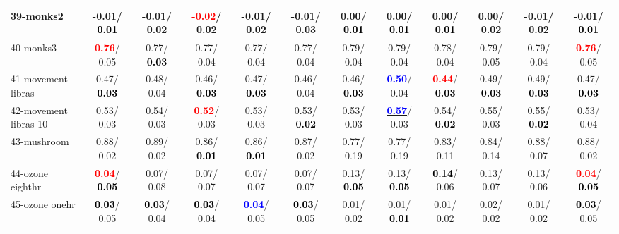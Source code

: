 \begin{table}[h]
\begin{center}
{\begin{tabular}{lc|c|c|c|c|c|c|c|c|c|c}
39-monks2 &  -0.01/\textcolor{black}{\textbf{  0.01}} &  -0.01/  0.02 & \textcolor{red}{\textbf{ -0.02}}/  0.02 &  -0.01/  0.02 &  -0.01/  0.03 &   0.00/\textcolor{black}{\textbf{  0.01}} &   0.00/\textcolor{black}{\textbf{  0.01}} &   0.00/\textcolor{black}{\textbf{  0.01}} &   0.00/  0.02 &  -0.01/  0.02 &  -0.01/\textcolor{black}{\textbf{  0.01}} \\ \hline
40-monks3 & \textcolor{red}{\textbf{  0.76}}/  0.05 &   0.77/\textcolor{black}{\textbf{  0.03}} &   0.77/  0.04 &   0.77/  0.04 &   0.77/  0.04 &   0.79/  0.04 &   0.79/  0.04 &   0.78/  0.04 &   0.79/  0.05 &   0.79/  0.04 & \textcolor{red}{\textbf{  0.76}}/  0.05 \\
41-movement libras &   0.47/\textcolor{black}{\textbf{  0.03}} &   0.48/  0.04 &   0.46/\textcolor{black}{\textbf{  0.03}} &   0.47/\textcolor{black}{\textbf{  0.03}} &   0.46/  0.04 &   0.46/\textcolor{black}{\textbf{  0.03}} & \textcolor{blue}{\textbf{  0.50}}/  0.04 & \textcolor{red}{\textbf{  0.44}}/\textcolor{black}{\textbf{  0.03}} &   0.49/\textcolor{black}{\textbf{  0.03}} &   0.49/\textcolor{black}{\textbf{  0.03}} &   0.47/\textcolor{black}{\textbf{  0.03}} \\
42-movement libras 10 &   0.53/  0.03 &   0.54/  0.03 & \textcolor{red}{\textbf{  0.52}}/  0.03 &   0.53/  0.03 &   0.53/\textcolor{black}{\textbf{  0.02}} &   0.53/  0.03 & \underline{\textcolor{blue}{\textbf{  0.57}}}/  0.03 &   0.54/\textcolor{black}{\textbf{  0.02}} &   0.55/  0.03 &   0.55/\textcolor{black}{\textbf{  0.02}} &   0.53/  0.04 \\
43-mushroom &   0.88/  0.02 &   0.89/  0.02 &   0.86/\textcolor{black}{\textbf{  0.01}} &   0.86/\textcolor{black}{\textbf{  0.01}} &   0.87/  0.02 &   0.77/  0.19 &   0.77/  0.19 &   0.83/  0.11 &   0.84/  0.14 &   0.88/  0.07 &   0.88/  0.02 \\
44-ozone eighthr & \textcolor{red}{\textbf{  0.04}}/\textcolor{black}{\textbf{  0.05}} &   0.07/  0.08 &   0.07/  0.07 &   0.07/  0.07 &   0.07/  0.07 &   0.13/\textcolor{black}{\textbf{  0.05}} &   0.13/\textcolor{black}{\textbf{  0.05}} & \textcolor{black}{\textbf{  0.14}}/  0.06 &   0.13/  0.07 &   0.13/  0.06 & \textcolor{red}{\textbf{  0.04}}/\textcolor{black}{\textbf{  0.05}} \\
45-ozone onehr & \textcolor{black}{\textbf{  0.03}}/  0.05 & \textcolor{black}{\textbf{  0.03}}/  0.04 & \textcolor{black}{\textbf{  0.03}}/  0.04 & \underline{\textcolor{blue}{\textbf{  0.04}}}/  0.05 & \textcolor{black}{\textbf{  0.03}}/  0.05 &   0.01/  0.02 &   0.01/\textcolor{black}{\textbf{  0.01}} &   0.01/  0.02 &   0.02/  0.02 &   0.01/  0.02 & \textcolor{black}{\textbf{  0.03}}/  0.05 \\

\end{tabular}}
\end{center}
\end{table}
